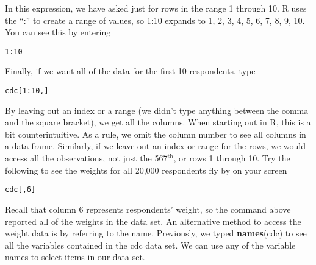 \documentclass{article}\usepackage[]{graphicx}\usepackage[]{color}
\makeatletter
\newcommand{\hlnum}[1]{\textcolor[rgb]{0.686,0.059,0.569}{#1}}%
\newcommand{\hlopt}[1]{\textcolor[rgb]{0,0,0}{#1}}%
\newcommand{\hlstd}[1]{\textcolor[rgb]{0.345,0.345,0.345}{#1}}%
\newcommand{\hlkwd}[1]{\textcolor[rgb]{0.737,0.353,0.396}{\textbf{#1}}}%
\newenvironment{kframe}{%
 \def\at@end@of@kframe{}%
 \ifinner\ifhmode%
  \def\at@end@of@kframe{\end{minipage}}%
  \begin{minipage}{\columnwidth}%
 \fi\fi%
 \def\FrameCommand##1{\hskip\@totalleftmargin \hskip-\fboxsep
 \colorbox{shadecolor}{##1}\hskip-\fboxsep
     \hskip-\linewidth \hskip-\@totalleftmargin \hskip\columnwidth}%
 \MakeFramed {\advance\hsize-\width
   \@totalleftmargin\z@ \linewidth\hsize
   \@setminipage}}%
 {\par\unskip\endMakeFramed%
 \at@end@of@kframe}
\newenvironment{knitrout}{}{} %
\makeatother
\begin{document}
In this expression, we have asked just for rows in the range 1 through 10.  R uses the ``:'' to create a range of values, so 1:10 expands to 1, 2, 3, 4, 5, 6, 7, 8, 9, 10. You can see this by entering

\begin{knitrout}
\color{fgcolor}\begin{kframe}
\begin{alltt}
\hlnum{1}\hlopt{:}\hlnum{10}
\end{alltt}
\end{kframe}
\end{knitrout}


Finally, if we want all of the data for the first 10 respondents, type

\begin{knitrout}
\color{fgcolor}\begin{kframe}
\begin{alltt}
\hlstd{cdc[}\hlnum{1}\hlopt{:}\hlnum{10}\hlstd{, ]}
\end{alltt}
\end{kframe}
\end{knitrout}


By leaving out an index or a range (we didn't type anything between the comma and the square bracket), we get all the columns. When starting out in R, this is a bit counterintuitive. As a rule, we omit the column number to see all columns in a data frame. Similarly, if we leave out an index or range for the rows, we would access all the observations, not just the 567$^{\textrm{th}}$, or rows 1 through 10. Try the following to see the weights for all 20,000 respondents fly by on your screen

\begin{knitrout}
\color{fgcolor}\begin{kframe}
\begin{alltt}
\hlstd{cdc[,} \hlnum{6}\hlstd{]}
\end{alltt}
\end{kframe}
\end{knitrout}


Recall that column 6 represents respondents' weight, so the command above reported all of the weights in the data set. An alternative method to access the weight data is by referring to the name.  Previously, we typed \hlkwd{names}\hlstd{(}\hlstd{cdc}\hlstd{)} to see all the variables contained in the cdc data set. We can use any of the variable names to select items in our data set. 
\end{document}
